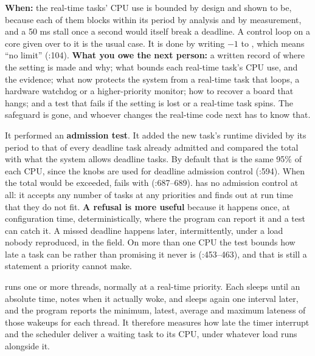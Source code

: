  \textbf{When:} the real-time tasks' CPU use is bounded by design and shown to be,
because each of them blocks within its period by analysis and by measurement, and a 50 ms stall
once a second would itself break a deadline. A control loop on a core given over to it is the
usual case. It is done by writing $-1$ to , which means ``no limit''
(:104). \textbf{What you owe the next person:} a
written record of where the setting is made and why; what bounds each real-time task's CPU use,
and the evidence; what now protects the system from a real-time task that loops, a hardware
watchdog or a higher-priority monitor; how to recover a board that hangs; and a test that fails if
the setting is lost or a real-time task spins. The safeguard is gone, and whoever changes the
real-time code next has to know that.

 It performed an \textbf{admission test}. It added the new task's runtime divided by its
period to that of every deadline task already admitted and compared the total with what the system
allows deadline tasks. By default that is the same 95\% of each CPU, since the  knobs are
used for deadline admission control
(:594). When the total would be exceeded,
 fails with  (:687--689).
 has no admission control at all: it accepts any number of tasks at any priorities
and finds out at run time that they do not fit. \textbf{A refusal is more useful} because it happens
once, at configuration time, deterministically, where the program can report it and a test can catch
it. A missed deadline happens later, intermittently, under a load nobody reproduced, in the field.
On more than one CPU the test bounds how late a task can be rather than promising it never is
(:453--463), and that is still a statement a
priority cannot make.


  runs one or more threads, normally at a real-time priority. Each sleeps
until an absolute time, notes when it actually woke, and sleeps again one interval later, and the
program reports the minimum, latest, average and maximum lateness of those wakeups for each thread.
It therefore measures how late the timer interrupt and the scheduler deliver a waiting task to its
CPU, under whatever load runs alongside it.

